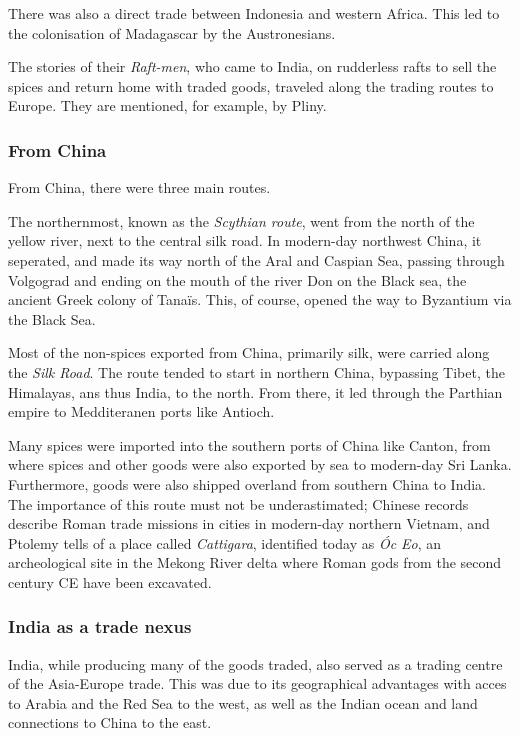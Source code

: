 \documentclass[11pt, a4paper, headings=standardclasses]{scrartcl}
\begin{document}
There was also a direct trade between Indonesia and western Africa. This led to the colonisation of Madagascar by the Austronesians.\autocite{Madagascar}

The stories of their \emph{Raft-men}, who came to India, on rudderless rafts to sell the spices and return home with traded goods, traveled along the trading routes to Europe. They are mentioned, for example, by Pliny.\autocite[Chapter 8]{Rome}

\subsubsection{From China}

From China, there were three main routes.

The northernmost, known as the \emph{Scythian route}, went from the north of the yellow river, next to the central silk road. In modern-day northwest China, it seperated, and made its way north of the Aral and Caspian Sea, passing through Volgograd and ending on the mouth of the river Don on the Black sea, the ancient Greek colony of Tana\"{i}s. This, of course, opened the way to Byzantium via the Black Sea.\autocite[149]{Rome}

Most of the non-spices exported from China, primarily silk, were carried along the \emph{Silk Road}. The route tended to start in northern China, bypassing Tibet, the Himalayas, ans thus India, to the north. From there, it led through the Parthian empire\autocite{SilkRome} to Medditeranen ports like Antioch.\autocite[Chapter 7, Maps 2 and 3]{Rome}

Many spices were imported into the southern ports of China like Canton, from where spices and other goods were also exported by sea to modern-day Sri Lanka. Furthermore, goods were also shipped overland from southern China to India.\autocite[Maps 4 and 5]{Rome} The importance of this route must not be underastimated; Chinese records describe Roman trade missions in cities in modern-day northern Vietnam\autocite{curtin_1984}, and Ptolemy tells of a place called \emph{Cattigara}, identified today as \emph{\'{O}c Eo}, an archeological site in the Mekong River delta where Roman gods from the second century CE have been excavated.\autocite{OcEo}

\subsubsection{India as a trade nexus}
India, while producing many of the goods traded, also served as a trading centre of the Asia-Europe trade. This was due to its geographical advantages with acces to Arabia and the Red Sea to the west, as well as the Indian ocean and land connections to China to the east.
\end{document}
